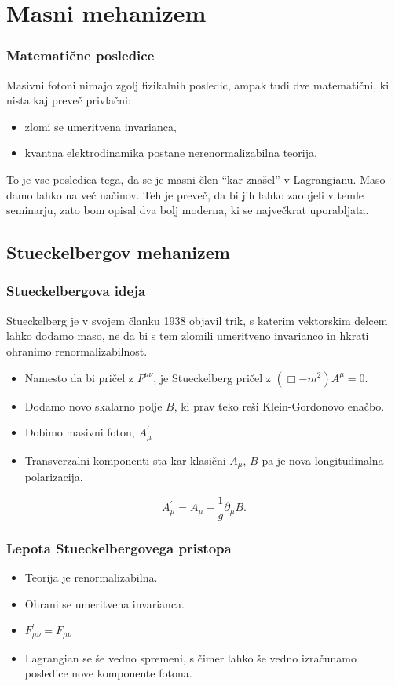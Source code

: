 \documentclass{beamer}
\begin{document}
\section{Masni mehanizem}

\begin{frame}[t]
	\frametitle{Matematične posledice}
	Masivni fotoni nimajo zgolj fizikalnih posledic, ampak tudi dve matematični, ki nista kaj preveč privlačni:
	\begin{itemize}
		\item{zlomi se umeritvena invarianca,}
		\item{kvantna elektrodinamika postane nerenormalizabilna teorija.}
	\end{itemize}

	To je vse posledica tega, da se je masni člen "`kar znašel"' v Lagrangianu. Maso damo lahko na več načinov.
	Teh je preveč, da bi jih lahko zaobjeli v temle seminarju, zato bom opisal dva bolj moderna, ki se največkrat
	uporabljata.
\end{frame}

\subsection{Stueckelbergov mehanizem}
\begin{frame}[t]
	\frametitle{Stueckelbergova ideja}
	Stueckelberg je v svojem članku 1938 objavil trik, s katerim vektorskim delcem lahko dodamo maso, ne da bi s tem
	zlomili umeritveno invarianco in hkrati ohranimo renormalizabilnost.
	
	\begin{itemize}
		\item{Namesto da bi pričel z $F^{\mu\nu}$, je Stueckelberg pričel z $(\Box - m^2)A^\mu = 0$.}
		\item{Dodamo novo skalarno polje $B$, ki prav teko reši Klein-Gordonovo enačbo.}
		\item{Dobimo masivni foton, $A_\mu^\prime$}
		\item{Transverzalni komponenti sta kar klasični $A_\mu$, $B$ pa je
			nova longitudinalna polarizacija.}
	\end{itemize}
	\[
		A_\mu^\prime = A_\mu + \frac{1}{g}\partial_\mu B.
	\]
\end{frame}

\begin{frame}
	\frametitle{Lepota Stueckelbergovega pristopa}
	\begin{itemize}
		\item{Teorija je renormalizabilna.}
		\item{Ohrani se umeritvena invarianca.}
		\item{$F_{\mu\nu}^\prime = F_{\mu\nu}$}
		\item{Lagrangian se še vedno spremeni, s čimer lahko še vedno izračunamo posledice nove komponente fotona.}
	\end{itemize}
\end{frame}
\end{document}
